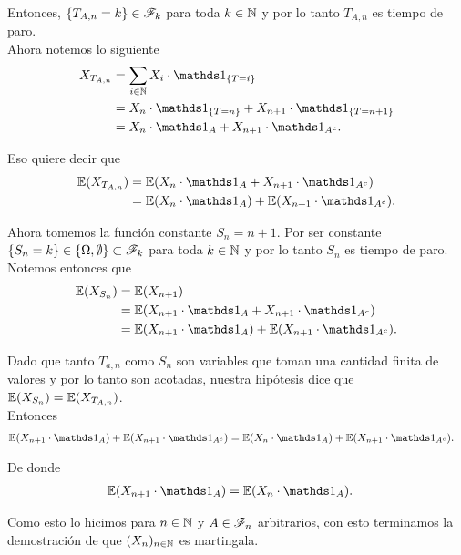 	Entonces, $\{ T_{A,n} = k\} \in \mathscr{F}_k$ para toda $k \in \mathbb{N}$ y por lo tanto $T_{A,n}$ es tiempo de paro.\\

    Ahora notemos lo siguiente
    \begin{align}
    	X_{T_{A,n}} 	&=		\sum_{i \in \N} X_i \cdot  \indic_{\{T=i\}}						\\
    					&=		X_n \cdot  \indic_{\{T=n\}} + X_{n+1} \cdot  \indic_{\{T=n+1\}}	\\
    					&=		X_n \cdot  \indic_{A} + X_{n+1} \cdot  \indic_{A^c}.
    \end{align}
    
    Eso quiere decir que
    \begin{align}
    	\E(X_{T_{A,n}}) 	&=	\E(X_n \cdot  \indic_{A} + X_{n+1} \cdot  \indic_{A^c})		\\
							&=	\E(X_n \cdot  \indic_{A}) + \E(X_{n+1} \cdot  \indic_{A^c}).
    \end{align}
    
    Ahora tomemos la función constante $S_n = n+1$. Por ser constante \\
    $\{S_n = k\} \in \{ \Omega, \emptyset\} \subset \mathscr{F}_k$ para toda $k \in \mathbb{N}$
    y por lo tanto $S_n$ es tiempo de paro.\\
    
    Notemos entonces que
    \begin{align}
    	\E(X_{S_n}) 	&= 		\E(X_{n+1}) 													\\
    					&=		\E(X_{n+1} \cdot \indic_A + X_{n+1} \cdot \indic_{A^c}) 		\\
    					&=		\E(X_{n+1} \cdot \indic_A) +\E( X_{n+1} \cdot \indic_{A^c}). 
    \end{align}
    
    Dado que tanto $T_{a,n}$ como $S_n$ son variables que toman una cantidad finita de valores y por lo tanto son acotadas, 
    nuestra hipótesis dice que \\
    $\mathbb{E}(X_{S_n}) = \mathbb{E}(X_{T_{A,n}})$. \\
    
    Entonces
    \begin{align}
		\E(X_{n+1} \cdot \indic_A) +\E( X_{n+1} \cdot \indic_{A^c}) &=  \E(X_n \cdot  \indic_{A}) + \E(X_{n+1} \cdot  \indic_{A^c}).
    \end{align}
    
    De donde
    \begin{align}
			\E(X_{n+1} \cdot \indic_A) &=	\E(X_n \cdot  \indic_{A}).
    \end{align}
    
    Como esto lo hicimos para $n \in \mathbb{N}$ y $A \in \mathscr{F}_n$ arbitrarios, con esto terminamos la demostración de que $(X_n)_{n \in \mathbb{N}}$ es
    martingala.